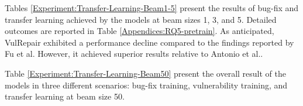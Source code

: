 \begin{table}[h]
\centering
  \caption{Bug-Fix and Transfer Learning Performance at Beam size of 1,3 and 5}
  \label{Experiment:Transfer-Learning-Beam1-5}
\end{table}


Tables \ref{Experiment:Transfer-Learning-Beam1-5} present the results of bug-fix and transfer learning achieved by the models at beam sizes 1, 3, and 5. 
Detailed outcomes are reported in Table \ref{Appendices:RQ5-pretrain}. 
As anticipated, VulRepair exhibited a performance decline compared to the findings reported by Fu et al.\cite{fu2024vision} However, it achieved superior results relative to Antonio et al.\cite{mastropaolo2024training}.

Table \ref{Experiment:Transfer-Learning-Beam50} present the overall result of the models in three different scenarios: bug-fix training, vulnerability training, and transfer learning at beam size 50.



